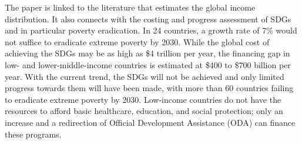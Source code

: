 The paper is linked to the literature that estimates the global income distribution.\cite{pinkovskiy_parametric_2009,anand_chapter_2015,lahoti_global_2016,lakner_global_2016,gradin_trends_2021,jorda_global_2019,alvaredo_methods_2021} 
It also connects with the costing and progress assessment of SDGs and in particular poverty eradication.\cite{schmidt-traub_investment_2015,rozenberg_beyond_2019,sdsn_sdg_2019,manuel_financing_2020,vorisek_understanding_2020,unctad_estimating_2021,un_sustainable_2022} In 24 countries, a growth rate of 7\% would not suffice to eradicate extreme poverty by 2030.\cite{unctad_estimating_2021} While the global cost of achieving the SDGs may be as high as \$4 trillion per year,\cite{unctad_world_2023} %
the financing gap in low- and lower-middle-income countries is estimated at \$400\cite{sdsn_sdg_2019} %
to \$700 billion\cite{kharas_building_2019} %
per year. With the current trend, the SDGs will not be achieved and only limited progress towards them will have been made, with more than 60 countries failing to eradicate extreme poverty by 2030.\cite{moyer_are_2020} %
Low-income countries do not have the resources to afford basic healthcare, education, and social protection; only an increase and a redirection of Official Development Assistance (ODA) can finance these programs.\cite{manuel_financing_2018} 


